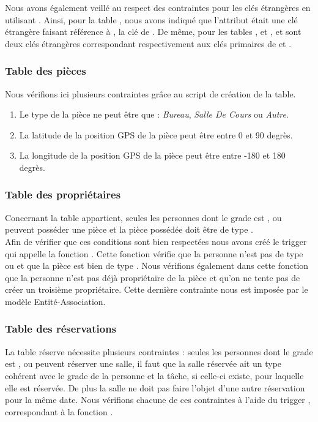	Nous avons également veillé au respect des contraintes pour les clés étrangères en utilisant . Ainsi, pour la table , nous avons indiqué que l'attribut  était une clé étrangère faisant référence à , la clé de . De même, pour les tables ,  et ,  et  sont deux clés étrangères correspondant respectivement aux clés primaires de  et .\\

\subsubsection{Table des pièces}
	Nous vérifions ici plusieurs contraintes grâce au script de création de la table.
	\begin{enumerate}
		\item Le type de la pièce ne peut être que : \textit{Bureau}, \textit{Salle De Cours} ou \textit{Autre}.
		\item La latitude de la position GPS de la pièce peut être entre 0 et 90 degrès.
		\item La longitude de la position GPS de la pièce peut être entre -180 et 180 degrès.
	\end{enumerate}

\subsubsection{Table des propriétaires}
	Concernant la table appartient, seules les personnes dont le grade est ,  ou  peuvent posséder une pièce et la pièce possédée doit être de type .\\

	Afin de vérifier que ces conditions sont bien respectées nous avons créé le trigger  qui appelle la fonction . Cette fonction vérifie que la personne n'est pas de type  ou  et que la pièce est bien de type . Nous vérifions également dans cette fonction que la personne n'est pas déjà propriétaire de la pièce et qu'on ne tente pas de créer un troisième propriétaire. Cette dernière contrainte nous est imposée par le modèle Entité-Association.

\subsubsection{Table des réservations}
	La table réserve nécessite plusieurs contraintes : seules les personnes dont le grade est ,  ou  peuvent réserver une salle, il faut que la salle réservée ait un type cohérent avec le grade de la personne et la tâche, si celle-ci existe, pour laquelle elle est réservée. De plus la salle ne doit pas faire l'objet d'une autre réservation pour la même date. Nous vérifions chacune de ces contraintes à l'aide du trigger , correspondant à la fonction .\\

